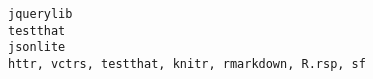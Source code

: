 \documentclass[
  letterpaper,
  DIV=11,
  numbers=noendperiod]{scrreprt}
\begin{document}
\begin{verbatim}
jquerylib                                                                                                                                                                                                                                                                                                                                                                                                                                                                                                                                                                                                                                                                                                                                                                                                                                                                                                                                                                                                                                                                                                                                                                                                                                                                                            testthat
jsonlite                                                                                                                                                                                                                                                                                                                                                                                                                                                                                                                                                                                                                                                                                                                                                                                                                                                                                                                                                                                                                                                                                                                                                                                                                                                   httr, vctrs, testthat, knitr, rmarkdown, R.rsp, sf

\end{verbatim}
\end{document}
